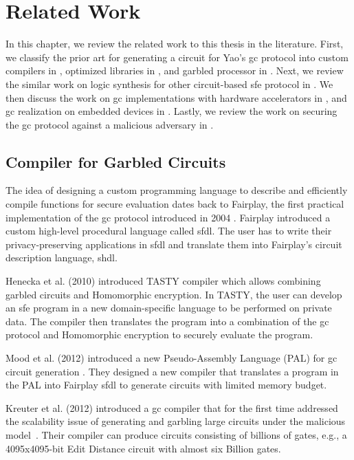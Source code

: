 \chapter{Related Work}\label{chap:related}
In this chapter, we review the related work to this thesis in the literature.
First, we classify the prior art for generating a circuit for Yao's \acrfull{gc} protocol into custom compilers in , optimized libraries in , and garbled processor in .
Next, we review the similar work on logic synthesis for other circuit-based \acrfull{sfe} protocol in .
We then discuss the work on \acrshort{gc} implementations with hardware accelerators in , and \acrshort{gc} realization on embedded devices in .
Lastly, we review the work on securing the \acrshort{gc} protocol against a malicious adversary in .

\section{Compiler for Garbled Circuits}\label{sec:related-compiler}
The idea of designing a custom programming language to describe and efficiently compile functions for secure evaluation dates back to Fairplay, the first practical implementation of the \acrshort{gc} protocol introduced in 2004 \cite{malkhi2004fairplay}.
Fairplay introduced a custom high-level procedural language called \acrfull{sfdl}.
The user has to write their privacy-preserving applications in \acrshort{sfdl} and translate them into Fairplay's circuit description language, \acrfull{shdl}.

Henecka et al. (2010) introduced TASTY compiler \cite{henecka2010tasty} which allows combining garbled circuits and Homomorphic encryption.
In TASTY, the user can develop an \acrshort{sfe} program in a new domain-specific language to be performed on private data.
The compiler then translates the program into a combination of the \acrshort{gc} protocol and Homomorphic encryption to securely evaluate the program.

Mood et al. (2012) introduced a new Pseudo-Assembly Language (PAL) for \acrshort{gc} circuit generation \cite{mood2012memory}.
They designed a new compiler that translates a program in the PAL into Fairplay \acrshort{sfdl} to generate circuits with limited memory budget.

Kreuter et al. (2012) introduced a \acrshort{gc} compiler that for the first time addressed the scalability issue of generating and garbling large circuits under the malicious model~\cite{kreuter2012billion}.
Their compiler can produce circuits consisting of billions of gates, e.g., a 4095x4095-bit Edit Distance circuit with almost six Billion gates.


